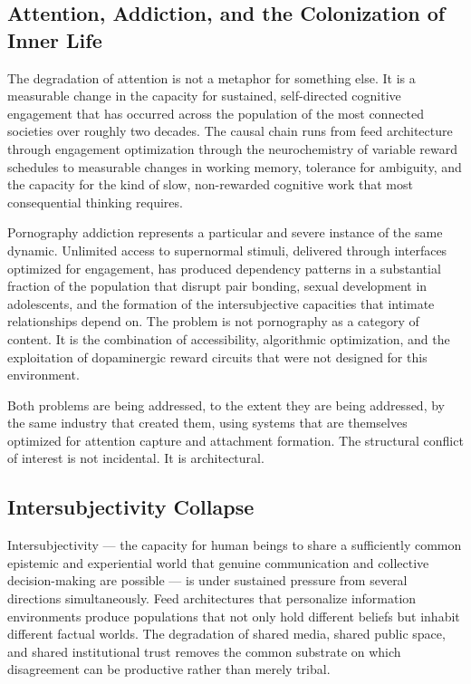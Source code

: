\documentclass[12pt, a4paper]{article}
\theoremstyle{remark}
\begin{document}
\subsection{Attention, Addiction, and the Colonization of Inner Life}

The degradation of attention is not a metaphor for something else. It is a measurable change in the capacity for sustained, self-directed cognitive engagement that has occurred across the population of the most connected societies over roughly two decades. The causal chain runs from feed architecture through engagement optimization through the neurochemistry of variable reward schedules to measurable changes in working memory, tolerance for ambiguity, and the capacity for the kind of slow, non-rewarded cognitive work that most consequential thinking requires.

Pornography addiction represents a particular and severe instance of the same dynamic. Unlimited access to supernormal stimuli, delivered through interfaces optimized for engagement, has produced dependency patterns in a substantial fraction of the population that disrupt pair bonding, sexual development in adolescents, and the formation of the intersubjective capacities that intimate relationships depend on. The problem is not pornography as a category of content. It is the combination of accessibility, algorithmic optimization, and the exploitation of dopaminergic reward circuits that were not designed for this environment.

Both problems are being addressed, to the extent they are being addressed, by the same industry that created them, using systems that are themselves optimized for attention capture and attachment formation. The structural conflict of interest is not incidental. It is architectural.

\subsection{Intersubjectivity Collapse}

Intersubjectivity --- the capacity for human beings to share a sufficiently common epistemic and experiential world that genuine communication and collective decision-making are possible --- is under sustained pressure from several directions simultaneously. Feed architectures that personalize information environments produce populations that not only hold different beliefs but inhabit different factual worlds. The degradation of shared media, shared public space, and shared institutional trust removes the common substrate on which disagreement can be productive rather than merely tribal.
\end{document}
